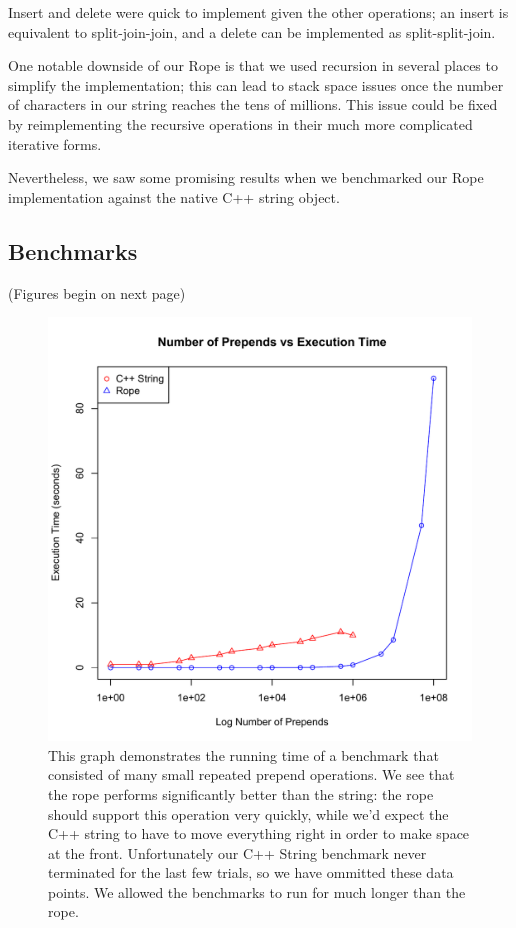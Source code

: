 \documentclass[12pt]{article}
\begin{document}
Insert and delete were quick to implement given the other operations; an insert is equivalent to split-join-join, and a delete can be implemented as split-split-join.

One notable downside of our Rope is that we used recursion in several places to simplify the implementation; this can lead to stack space issues once the number of characters in our string reaches the tens of millions. This issue could be fixed by reimplementing the recursive operations in their much more complicated iterative forms.

Nevertheless, we saw some promising results when we benchmarked our Rope implementation against the native C++ string object.
\subsection{Benchmarks}
(Figures begin on next page)

\begin{figure}[p]
\begin{centering}
\includegraphics[scale=1.0]{prepends_vs_execution}
\caption{This graph demonstrates the running time of a benchmark that consisted of many small repeated prepend operations. We see that the rope performs significantly better than the string: the rope should support this operation very quickly, while we'd expect the C++ string to have to move everything right in order to make space at the front. Unfortunately our C++ String benchmark never terminated for the last few trials, so we have ommitted these data points. We allowed the benchmarks to run for much longer than the rope.}

\end{centering}
\end{figure}
\end{document}
